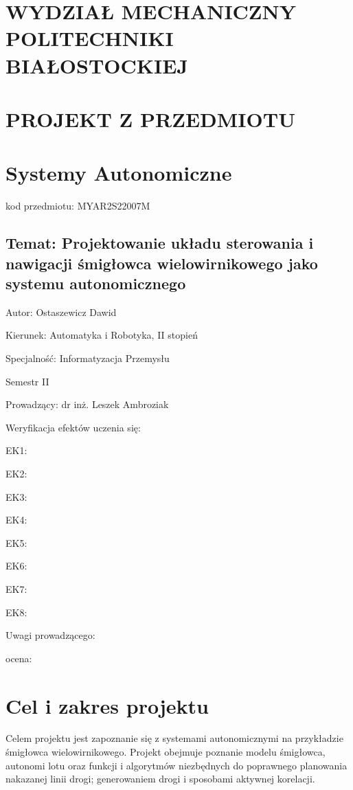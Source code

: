\documentclass[polish,11pt,a4paper]{article}
\begin{document}
\centering
\section*{WYDZIAŁ MECHANICZNY POLITECHNIKI BIAŁOSTOCKIEJ}
\section*{PROJEKT Z PRZEDMIOTU}
\section*{Systemy Autonomiczne}
\large
kod przedmiotu: MYAR2S22007M
\subsection*{Temat: Projektowanie układu sterowania i nawigacji
śmigłowca wielowirnikowego jako systemu
autonomicznego }
\vspace{2cm}
\raggedright
Autor: Ostaszewicz Dawid

Kierunek: Automatyka i Robotyka, II stopień

Specjalność: Informatyzacja Przemysłu

Semestr II

Prowadzący: dr inż. Leszek Ambroziak
\vspace{2cm}

Weryfikacja efektów uczenia się:

EK1: \dotso

EK2: \dotso

EK3: \dotso

EK4: \dotso

EK5: \dotso

EK6: \dotso

EK7: \dotso

EK8: \dotso

Uwagi prowadzącego:
\vspace{3cm}

ocena: \dotso
\clearpage

\justifying
\section*{Cel i zakres projektu}
Celem projektu jest zapoznanie się z systemami autonomicznymi na przykładzie śmigłowca
wielowirnikowego. Projekt obejmuje poznanie modelu śmigłowca, autonomi lotu oraz funkcji
i algorytmów niezbędnych do poprawnego planowania nakazanej linii drogi; generowaniem
drogi i sposobami aktywnej korelacji. 
\end{document}
